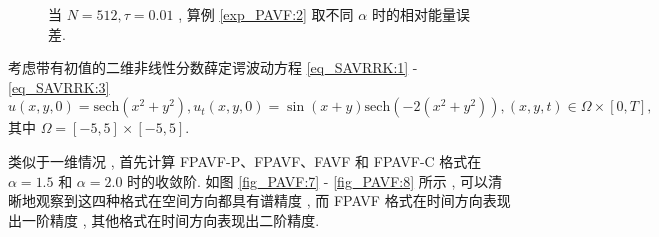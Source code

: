 	\begin{figure}[H]
	\begin{center}
	   
	\caption{当 $N = 512 , \tau=0.01$ , 算例 \ref{exp_PAVF:2} 取不同 $\alpha$ 时的相对能量误差.}\label{fig_PAVF:6}
	\end{center}
	\end{figure}
	\begin{example}\label{exp_PAVF:4}
		考虑带有初值的二维非线性分数薛定谔波动方程 \eqref{eq_SAVRRK:1} - \eqref{eq_SAVRRK:3}
		\begin{equation}\label{eq_PAVF_110}
		u(x , y , 0)=\mbox{sech}\left(x^2+y^2\right) , u_t(x , y , 0)=\sin (x+y) \mbox{sech}\left(-2(x^2+y^2)\right) , (x , y , t)\in  \Omega\times[0 , T] , 
		\end{equation}
		其中 $\Omega=[-5 , 5] \times[-5 , 5]$.
		\end{example}

	类似于一维情况 , 首先计算 FPAVF-P、FPAVF、FAVF 和 FPAVF-C 格式在 $\alpha=1.5$ 和 $\alpha=2.0$ 时的收敛阶.
	如图 \ref{fig_PAVF:7} - \ref{fig_PAVF:8} 所示 , 可以清晰地观察到这四种格式在空间方向都具有谱精度 , 而 FPAVF 格式在时间方向表现出一阶精度 , 其他格式在时间方向表现出二阶精度.

